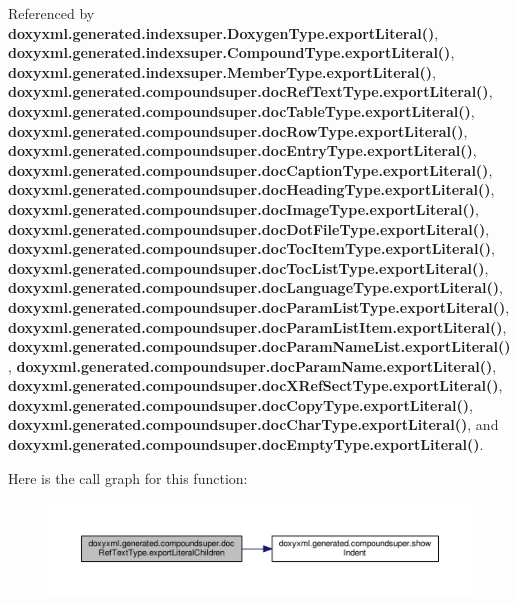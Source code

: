 Referenced by {\bf doxyxml.\+generated.\+indexsuper.\+Doxygen\+Type.\+export\+Literal()}, {\bf doxyxml.\+generated.\+indexsuper.\+Compound\+Type.\+export\+Literal()}, {\bf doxyxml.\+generated.\+indexsuper.\+Member\+Type.\+export\+Literal()}, {\bf doxyxml.\+generated.\+compoundsuper.\+doc\+Ref\+Text\+Type.\+export\+Literal()}, {\bf doxyxml.\+generated.\+compoundsuper.\+doc\+Table\+Type.\+export\+Literal()}, {\bf doxyxml.\+generated.\+compoundsuper.\+doc\+Row\+Type.\+export\+Literal()}, {\bf doxyxml.\+generated.\+compoundsuper.\+doc\+Entry\+Type.\+export\+Literal()}, {\bf doxyxml.\+generated.\+compoundsuper.\+doc\+Caption\+Type.\+export\+Literal()}, {\bf doxyxml.\+generated.\+compoundsuper.\+doc\+Heading\+Type.\+export\+Literal()}, {\bf doxyxml.\+generated.\+compoundsuper.\+doc\+Image\+Type.\+export\+Literal()}, {\bf doxyxml.\+generated.\+compoundsuper.\+doc\+Dot\+File\+Type.\+export\+Literal()}, {\bf doxyxml.\+generated.\+compoundsuper.\+doc\+Toc\+Item\+Type.\+export\+Literal()}, {\bf doxyxml.\+generated.\+compoundsuper.\+doc\+Toc\+List\+Type.\+export\+Literal()}, {\bf doxyxml.\+generated.\+compoundsuper.\+doc\+Language\+Type.\+export\+Literal()}, {\bf doxyxml.\+generated.\+compoundsuper.\+doc\+Param\+List\+Type.\+export\+Literal()}, {\bf doxyxml.\+generated.\+compoundsuper.\+doc\+Param\+List\+Item.\+export\+Literal()}, {\bf doxyxml.\+generated.\+compoundsuper.\+doc\+Param\+Name\+List.\+export\+Literal()}, {\bf doxyxml.\+generated.\+compoundsuper.\+doc\+Param\+Name.\+export\+Literal()}, {\bf doxyxml.\+generated.\+compoundsuper.\+doc\+X\+Ref\+Sect\+Type.\+export\+Literal()}, {\bf doxyxml.\+generated.\+compoundsuper.\+doc\+Copy\+Type.\+export\+Literal()}, {\bf doxyxml.\+generated.\+compoundsuper.\+doc\+Char\+Type.\+export\+Literal()}, and {\bf doxyxml.\+generated.\+compoundsuper.\+doc\+Empty\+Type.\+export\+Literal()}.



Here is the call graph for this function\+:
\nopagebreak
\begin{figure}[H]
\begin{center}
\leavevmode
\includegraphics[width=350pt]{d6/d3c/classdoxyxml_1_1generated_1_1compoundsuper_1_1docRefTextType_afa626991395e7c8cb78a209f8543de18_cgraph}
\end{center}
\end{figure}




